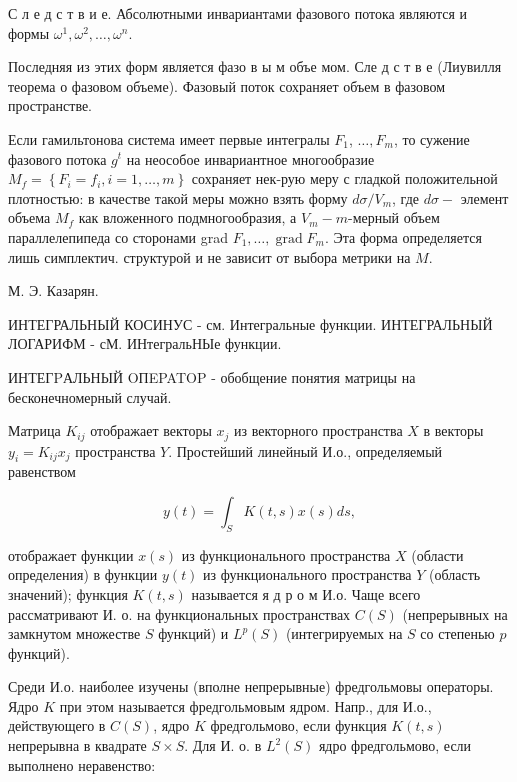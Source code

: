 \documentclass[10pt]{article}
\begin{document}
С л е д с т в и е. Абсолютными инвариантами фазового потока являются и формы $\omega^{1}, \omega^{2}, \ldots, \omega^{n}$.



Последняя из этих форм является фазо в ы м объе мом. Сле д с т в е (Лиувилля теорема о фазовом объеме). Фазовый поток сохраняет объем в фазовом пространстве.



Если гамильтонова система имеет первые интегралы $F_{1}$, $\ldots, F_{m}$, то сужение фазового потока $g^{t}$ на неособое инвариантное многообразие $M_{f}=\left\{F_{i}=f_{i}, i=1, \ldots, m\right\}$ сохраняет нек-рую меру с гладкой положительной плотностью: в качестве такой меры можно взять форму $d \sigma / V_{m}$, где $d \sigma-$ элемент объема $M_{f}$ как вложенного подмногообразия, а $V_{m}-m$-мерный объем параллелепипеда со сторонами grad $F_{1}, \ldots, \operatorname{grad} F_{m}$. Эта форма определяется лишь симплектич. структурой и не зависит от выбора метрики на $M$.



М. Э. Казарян.



ИНТЕГРАЛЬНЫЙ КОСИНУС - см. Интегральные функции. ИНТЕГРАЛЬНЫЙ ЛОГАРИФМ - сМ. ИНтегральНЫе функции.



ИНТЕГPАЛЬНЫЙ OПEPATOP - обобщение понятия матрицы на бесконечномерный случай.



Матрица $K_{i j}$ отображает векторы $x_{j}$ из векторного пространства $X$ в векторы $y_{i}=K_{i j} x_{j}$ пространства $Y$. Простейший линейный И.о., определяемый равенством



\[

y(t)=\int_{S} K(t, s) x(s) d s,

\]



отображает функции $x(s)$ из функционального пространства $X$ (области определения) в функции $y(t)$ из функционального пространства $Y$ (область значений); функция $K(t, s)$ называется я д р о м И.о. Чаще всего рассматривают И. о. на функциональных пространствах $C(S)$ (непрерывных на замкнутом множестве $S$ функций) и $L^{p}(S)$ (интегрируемых на $S$ со степенью $p$ функций).



Среди И.о. наиболее изучены (вполне непрерывные) фредгольмовы операторы. Ядро $K$ при этом называется фредгольмовым ядром. Напр., для И.о., действующего в $C(S)$, ядро $K$ фредгольмово, если функция $K(t, s)$ непрерывна в квадрате $S \times S$. Для И. о. в $L^{2}(S)$ ядро фредгольмово, если выполнено неравенство:
\end{document}
